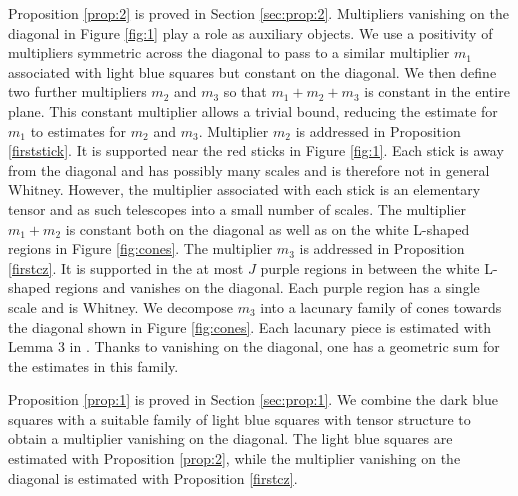 \documentclass[12pt,reqno]{amsart}
\theoremstyle{plain}
\theoremstyle{definition}
\numberwithin{equation}{section}
\begin{document}
Proposition \ref{prop:2}
is proved in Section \ref{sec:prop:2}. Multipliers vanishing on
the diagonal in Figure \ref{fig:1} play a role as auxiliary objects. We use a positivity of  multipliers
symmetric across the diagonal
to pass to a similar multiplier $m_1$ associated with light blue squares 
but constant on the diagonal.
We then define two further multipliers
$m_2$ and $m_3$ so that $m_1+m_2+m_3$ is constant in the entire plane. This constant multiplier allows
a trivial bound, reducing the estimate for $m_1$ to estimates for $m_2$ and $m_3$.
Multiplier $m_2$ is addressed in Proposition \ref{firststick}.
It is supported near the 
red sticks in Figure \ref{fig:1}. Each stick
is away from the diagonal and has possibly many scales and is therefore not in general Whitney.
However, the multiplier associated with each stick is an elementary tensor and as such telescopes into a small number of scales.
The multiplier $m_1+m_2$ is constant
both on the diagonal as well as on the white L-shaped regions in Figure \ref{fig:cones}.
The multiplier $m_3$ 
is addressed in Proposition 
\ref{firstcz}. 
It is supported
in the at most $J$ purple regions in between
the white L- shaped regions and vanishes on the diagonal. 
Each purple region has a single scale and is Whitney. 
We decompose $m_3$ into a lacunary family of cones towards the diagonal shown in Figure \ref{fig:cones}.
Each lacunary piece is estimated
with Lemma 3 in \cite{MR4171366}. Thanks to vanishing on the diagonal, one has
a geometric sum for the estimates in this family.


Proposition \ref{prop:1} is proved in Section \ref{sec:prop:1}.
We combine the dark blue squares with a  suitable
family of light blue squares with tensor structure
to obtain a multiplier vanishing on the diagonal.
The light blue squares are estimated with Proposition \ref{prop:2}, while the multiplier vanishing on the diagonal is estimated with
Proposition \ref{firstcz}.
\end{document}
